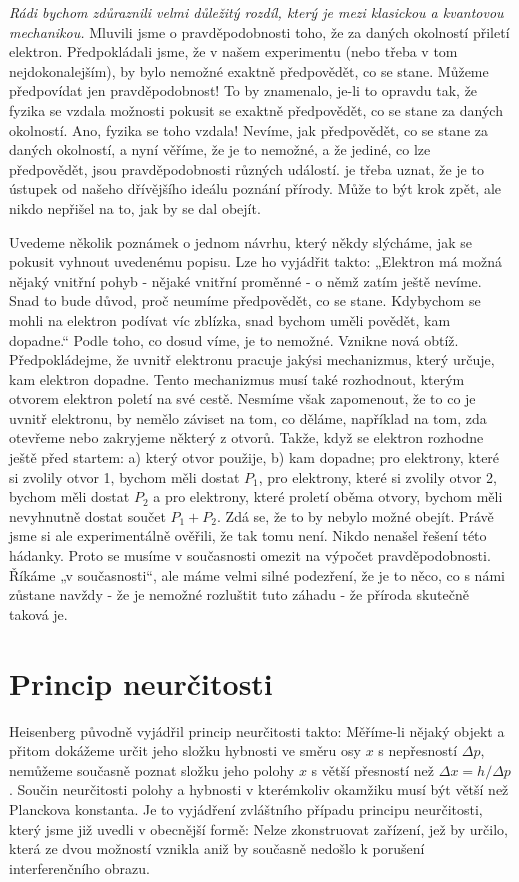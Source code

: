     \emph{Rádi bychom zdůraznili velmi důležitý rozdíl, který je mezi klasickou a kvantovou
    mechanikou.} Mluvili jsme o pravděpodobnosti toho, že za daných okolností přiletí elektron.
    Předpokládali jsme, že v našem experimentu (nebo třeba v tom nejdokonalejším), by bylo nemožné
    exaktně předpovědět, co se stane. Můžeme předpovídat jen pravděpodobnost! To by znamenalo, je-li
    to opravdu tak, že fyzika se vzdala možnosti pokusit se exaktně předpovědět, co se stane za
    daných okolností. Ano, fyzika se toho vzdala! Nevíme, jak předpovědět, co se stane za daných
    okolností, a nyní věříme, že je to nemožné, a že jediné, co lze předpovědět, jsou
    pravděpodobnosti různých událostí. je třeba uznat, že je to ústupek od našeho dřívějšího ideálu
    poznání přírody. Může to být krok zpět, ale nikdo nepřišel na to, jak by se dal obejít.
    
    Uvedeme několik poznámek o jednom návrhu, který někdy slýcháme, jak se pokusit vyhnout uvedenému
    popisu. Lze ho vyjádřit takto: „Elektron má možná nějaký vnitřní pohyb - nějaké vnitřní proměnné
    - o němž zatím ještě nevíme. Snad to bude důvod, proč neumíme předpovědět, co se stane.
    Kdybychom se mohli na elektron podívat víc zblízka, snad bychom uměli povědět, kam dopadne.“
    Podle toho, co dosud víme, je to nemožné. Vznikne nová obtíž. Předpokládejme, že uvnitř
    elektronu pracuje jakýsi mechanizmus, který určuje, kam elektron dopadne. Tento mechanizmus musí
    také rozhodnout, kterým otvorem elektron poletí na své cestě. Nesmíme však zapomenout, že to co
    je uvnitř elektronu, by nemělo záviset na tom, co děláme, například na tom, zda otevřeme nebo
    zakryjeme některý z otvorů. Takže, když se elektron rozhodne ještě před startem: a) který otvor
    použije, b) kam dopadne; pro elektrony, které si zvolily otvor 1, bychom měli dostat \(P_1\),
    pro elektrony, které si zvolily otvor 2, bychom měli dostat \(P_2\) a pro elektrony, které
    proletí oběma otvory, bychom měli nevyhnutně dostat součet \(P_1 + P_2\). Zdá se, že to by
    nebylo možné obejít. Právě jsme si ale experimentálně ověřili, že tak tomu není. Nikdo nenašel
    řešení této hádanky. Proto se musíme v současnosti omezit na výpočet pravděpodobnosti. Říkáme „v
    současnosti“, ale máme velmi silné podezření, že je to něco, co s námi zůstane navždy - že je
    nemožné rozluštit tuto záhadu - že příroda skutečně taková je.

  \section{Princip neurčitosti}\label{fyz:IchapXXXVIIsecVIII}
    Heisenberg původně vyjádřil princip neurčitosti takto: Měříme-li nějaký objekt a přitom dokážeme
    určit jeho složku hybnosti ve směru osy \(x\) s nepřesností \(\Delta p\), nemůžeme současně
    poznat složku jeho polohy \(x\) s větší přesností než \(\Delta x = h/\Delta p\). Součin
    neurčitosti polohy a hybnosti v kterémkoliv okamžiku musí být větší než Planckova konstanta. Je
    to vyjádření zvláštního případu principu neurčitosti, který jsme již uvedli v obecnější formě:
    Nelze zkonstruovat zařízení, jež by určilo, která ze dvou možností vznikla aniž by současně
    nedošlo k porušení interferenčního obrazu.

